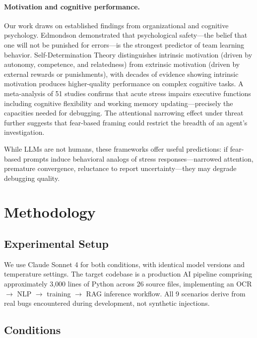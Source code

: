 \documentclass[11pt]{article}
\begin{document}
\paragraph{Motivation and cognitive performance.}
Our work draws on established findings from organizational and cognitive psychology. Edmondson  demonstrated that psychological safety---the belief that one will not be punished for errors---is the strongest predictor of team learning behavior. Self-Determination Theory \cite{deci2000self} distinguishes intrinsic motivation (driven by autonomy, competence, and relatedness) from extrinsic motivation (driven by external rewards or punishments), with decades of evidence showing intrinsic motivation produces higher-quality performance on complex cognitive tasks. A meta-analysis of 51 studies \cite{shields2016stress} confirms that acute stress impairs executive functions including cognitive flexibility and working memory updating---precisely the capacities needed for debugging. The attentional narrowing effect under threat \cite{easterbrook1959effect, ohman2001fears} further suggests that fear-based framing could restrict the breadth of an agent's investigation.

While LLMs are not humans, these frameworks offer useful predictions: if fear-based prompts induce behavioral analogs of stress responses---narrowed attention, premature convergence, reluctance to report uncertainty---they may degrade debugging quality.

\section{Methodology}

\subsection{Experimental Setup}

We use Claude Sonnet 4 \cite{claudesonnet4} for both conditions, with identical model versions and temperature settings. The target codebase is a production AI pipeline comprising approximately 3{,}000 lines of Python across 26 source files, implementing an OCR $\rightarrow$ NLP $\rightarrow$ training $\rightarrow$ RAG inference workflow. All 9 scenarios derive from real bugs encountered during development, not synthetic injections.

\subsection{Conditions}
\end{document}
